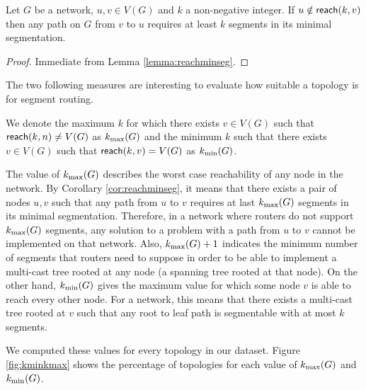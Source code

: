 \begin{corollary}
\label{cor:reachminseg}
Let $G$ be a network, $u, v \in V(G)$ and $k$ a non-negative integer. If $u \notin \textsf{reach}(k, v)$ then
any path on $G$ from $v$ to $u$ requires at least $k$ segments in its minimal segmentation.
\end{corollary}

\begin{proof}
Immediate from Lemma \ref{lemma:reachminseg}.
\end{proof}

The two following measures are interesting to evaluate how suitable a topology is for segment routing.

\begin{definition}
We denote the maximum $k$ for which there exists $v \in V(G)$ such that $\textsf{reach}(k, n) \neq V(G)$ as $k_{\max}(G)$ and
the minimum $k$ such that there exists $v \in V(G)$ such that $\textsf{reach}(k, v) = V(G)$ as $k_{\min}(G)$.
\end{definition}

The value of $k_{\max}(G)$ describes the worst case reachability of any node in the network. By Corollary \ref{cor:reachminseg}, it means that there exists
a pair of nodes $u, v$ such that any path from $u$ to $v$ requires at last $k_{\max}(G)$ segments in its minimal
segmentation. Therefore, in a network where routers do not support $k_{\max}(G)$ segments, any solution to a problem
with a path from $u$ to $v$ cannot be implemented on that network. Also, $k_{\max}(G) + 1$ indicates the minimum number of segments that
routers need to suppose in order to be able to implement a multi-cast tree rooted at any node (a spanning tree rooted at that node).
On the other hand, $k_{\min}(G)$ gives the maximum value for which some
node $v$ is able to reach every other node. For a network, this means that there exists a multi-cast tree rooted at 
$v$ such that any root to leaf path is segmentable with at most $k$ segments.

We computed these values for every topology in our dataset. Figure \ref{fig:kminkmax} shows the percentage of topologies for each value of 
$k_{\max}(G)$ and $k_{\min}(G)$.

